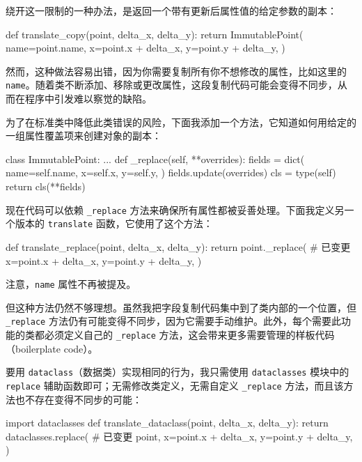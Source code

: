 绕开这一限制的一种办法，是返回一个带有更新后属性值的给定参数的副本：

\begin{codebox}[python]
def translate_copy(point, delta_x, delta_y):
    return ImmutablePoint(
        name=point.name,
        x=point.x + delta_x,
        y=point.y + delta_y,
    )
\end{codebox}

然而，这种做法容易出错，因为你需要复制所有你不想修改的属性，比如这里的 \texttt{name}。随着类不断添加、移除或更改属性，这段复制代码可能会变得不同步，从而在程序中引发难以察觉的缺陷。

为了在标准类中降低此类错误的风险，下面我添加一个方法，它知道如何用给定的一组属性覆盖项来创建对象的副本：

\begin{codebox}[python]
class ImmutablePoint:
    ...
    def _replace(self, **overrides):
        fields = dict(
            name=self.name,
            x=self.x,
            y=self.y,
        )
        fields.update(overrides)
        cls = type(self)
        return cls(**fields)
\end{codebox}

现在代码可以依赖 \texttt{\_replace} 方法来确保所有属性都被妥善处理。下面我定义另一个版本的 \texttt{translate} 函数，它使用了这个方法：

\begin{codebox}[python]
def translate_replace(point, delta_x, delta_y):
    return point._replace(  # 已变更
        x=point.x + delta_x,
        y=point.y + delta_y,
    )
\end{codebox}

注意，\texttt{name} 属性不再被提及。

但这种方法仍然不够理想。虽然我把字段复制代码集中到了类内部的一个位置，但 \texttt{\_replace} 方法仍有可能变得不同步，因为它需要手动维护。此外，每个需要此功能的类都必须定义自己的 \texttt{\_replace} 方法，这会带来更多需要管理的样板代码（boilerplate code）。

要用 \texttt{dataclass}（数据类）实现相同的行为，我只需使用 \texttt{dataclasses} 模块中的 \texttt{replace} 辅助函数即可；无需修改类定义，无需自定义 \texttt{\_replace} 方法，而且该方法也不存在变得不同步的可能：

\begin{codebox}[python]
import dataclasses
def translate_dataclass(point, delta_x, delta_y):
    return dataclasses.replace(  # 已变更
        point,
        x=point.x + delta_x,
        y=point.y + delta_y,
    )
\end{codebox}

